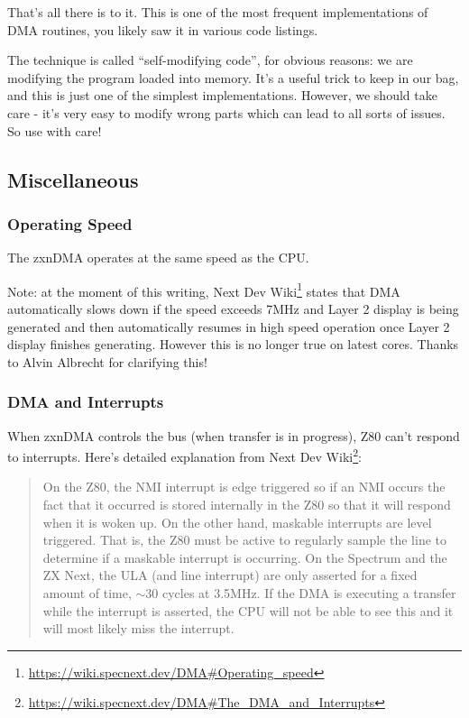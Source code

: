 {That's all there is to it. This is one of the most frequent implementations of DMA routines, you likely saw it in various code listings.

The technique is called ``self-modifying code'', for obvious reasons: we are modifying the program loaded into memory. It's a useful trick to keep in our bag, and this is just one of the simplest implementations. However, we should take care - it's very easy to modify wrong parts which can lead to all sorts of issues. So use with care!


\subsection{Miscellaneous}


\subsubsection{Operating Speed}

The zxnDMA operates at the same speed as the CPU.

Note: at the moment of this writing, Next Dev Wiki\footnote{\url{https://wiki.specnext.dev/DMA\#Operating_speed}} states that DMA automatically slows down if the speed exceeds 7MHz and Layer 2 display is being generated and then automatically resumes in high speed operation once Layer 2 display finishes generating. However this is no longer true on latest cores. Thanks to Alvin Albrecht for clarifying this!


\subsubsection{DMA and Interrupts}

When zxnDMA controls the bus (when transfer is in progress), Z80 can't respond to interrupts. Here's detailed explanation from Next Dev Wiki\footnote{\url{https://wiki.specnext.dev/DMA\#The_DMA_and_Interrupts}}:

\vspace*{-1ex}
\begin{quote}
	On the Z80, the NMI interrupt is edge triggered so if an NMI occurs the fact that it occurred is stored internally in the Z80 so that it will respond when it is woken up. On the other hand, maskable interrupts are level triggered. That is, the Z80 must be active to regularly sample the  line to determine if a maskable interrupt is occurring. On the Spectrum and the ZX Next, the ULA (and line interrupt) are only asserted for a fixed amount of time, $\sim$30 cycles at 3.5MHz. If the DMA is executing a transfer while the interrupt is asserted, the CPU will not be able to see this and it will most likely miss the interrupt.
\end{quote}

}
